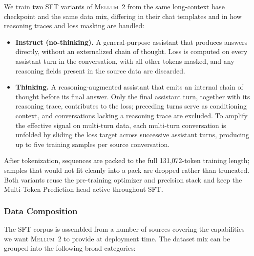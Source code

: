 \documentclass[11pt,a4paper]{article}
\newcommand{\modelname}{\textsc{Mellum~2}\xspace}
\begin{document}
We train two SFT variants of \modelname from the same long-context base
checkpoint and the same data mix, differing in their chat templates and in
how reasoning traces and loss masking are handled:

\begin{itemize}
  \item \textbf{Instruct (no-thinking).} A general-purpose assistant that
    produces answers directly, without an externalized chain of thought.
    Loss is computed on every assistant turn in the conversation, with all
    other tokens masked, and any reasoning fields present in the source data
    are discarded.
  \item \textbf{Thinking.} A reasoning-augmented assistant that emits an
    internal chain of thought before its final answer. Only the final
    assistant turn, together with its reasoning trace, contributes to the
    loss; preceding turns serve as conditioning context, and conversations
    lacking a reasoning trace are excluded. To amplify the effective signal
    on multi-turn data, each multi-turn conversation is unfolded by sliding
    the loss target across successive assistant turns, producing up to five
    training samples per source conversation.
\end{itemize}

After tokenization, sequences are packed to the full 131{,}072-token training
length; samples that would not fit cleanly into a pack are dropped rather
than truncated. Both variants reuse the pre-training optimizer and precision
stack and keep the Multi-Token Prediction head active throughout SFT.

\subsubsection{Data Composition}
\label{sec:sft-data}

The SFT corpus is assembled from a number of sources covering the
capabilities we want \modelname to provide at deployment time. The 
dataset mix can be grouped into the following broad categories:
\end{document}
